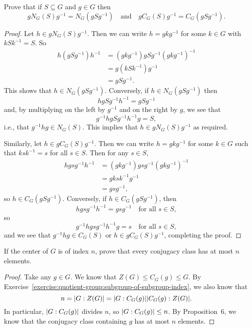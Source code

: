  Prove that if $S\subseteq G$ and $g\in G$ then
\begin{equation*}
  gN_G(S)g^{-1} = N_G(gSg^{-1}) \quad\text{and}\quad
  gC_G(S)g^{-1} = C_G(gSg^{-1}).
\end{equation*}
\begin{proof}
  Let $h\in gN_G(S)g^{-1}$. Then we can write $h = gkg^{-1}$ for some
  $k\in G$ with $kSk^{-1} = S$. So
  \begin{align*}
    h(gSg^{-1})h^{-1}
    &= (gkg^{-1})gSg^{-1}(gkg^{-1})^{-1} \\
    &= g(kSk^{-1})g^{-1} \\
    &= gSg^{-1}.
  \end{align*}
  This shows that $h \in N_G(gSg^{-1})$. Conversely, if
  $h\in N_G(gSg^{-1})$ then
  \begin{equation*}
    hgSg^{-1}h^{-1} = gSg^{-1}
  \end{equation*}
  and, by multiplying on the left by $g^{-1}$ and on the right by $g$,
  we see that
  \begin{equation*}
    g^{-1}hgSg^{-1}h^{-1}g = S,
  \end{equation*}
  i.e., that $g^{-1}hg\in N_G(S)$. This implies that
  $h \in gN_G(S)g^{-1}$ as required.

  Similarly, let $h\in gC_G(S)g^{-1}$. Then we can write
  $h = gkg^{-1}$ for some $k\in G$ such that $ksk^{-1} = s$ for all
  $s\in S$. Then for any $s\in S$,
  \begin{align*}
    hgsg^{-1}h^{-1}
    &= (gkg^{-1})gsg^{-1}(gkg^{-1})^{-1} \\
    &= gksk^{-1}g^{-1} \\
    &= gsg^{-1},
  \end{align*}
  so $h\in C_G(gSg^{-1})$. Conversely, if $h\in C_G(gSg^{-1})$, then
  \begin{equation*}
    hgsg^{-1}h^{-1} = gsg^{-1} \quad \text{for all $s\in S$},
  \end{equation*}
  so
  \begin{equation*}
    g^{-1}hgsg^{-1}h^{-1}g = s \quad \text{for all $s\in S$},
  \end{equation*}
  and we see that $g^{-1}hg\in C_G(S)$ or $h \in gC_G(S)g^{-1}$,
  completing the proof.
\end{proof}

 If the center of $G$ is of index $n$, prove that every
conjugacy class has at most $n$ elements.
\begin{proof}
  Take any $g\in G$. We know that
  $Z(G) \leq C_G(g) \leq G$. By
  Exercise~\ref{exercise:quotient-group:subgroup-of-subgroup-index},
  we also know that
  \begin{equation*}
    n = \lvert{G : Z(G)}\rvert = \lvert{G : C_G(g)}\rvert\lvert{C_G(g) : Z(G)}\rvert.
  \end{equation*}
  In particular, $\lvert{G : C_G(g)}\rvert$ divides $n$, so
  $\lvert{G : C_G(g)}\rvert\leq n$. By Proposition~6, we know that the
  conjugacy class containing $g$ has at most $n$ elements.
\end{proof}

